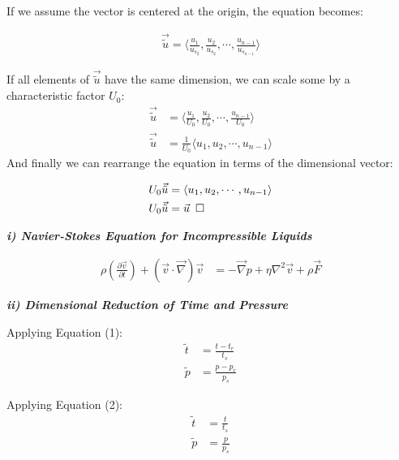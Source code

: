 \documentclass[titlepage]{article}
\begin{document}
\noindent If we assume the vector is centered at the origin, the equation becomes: 

\begin{align}
    \vec{\tilde{u}}=\langle{\displaystyle\frac{u_{1}}{u_{s_{2}}}, \displaystyle\frac{u_{2}}{u_{s_{2}}}, \cdots, \displaystyle\frac{u_{n-1}}{u_{s_{n-1}}}}\rangle
\end{align}

\noindent If all  elements of $\vec{\tilde{u}}$ have the same dimension, we can scale some by a characteristic factor $U_{0}$:
\begin{align}
    \vec{\tilde{u}} &= \langle{\displaystyle\frac{u_{1}}{U_{0}}, \displaystyle\frac{u_{2}}{U_{0}}, \cdots, \displaystyle\frac{u_{n-1}}{U_{0}}}\rangle \\
    \vec{\tilde{u}} &= \displaystyle\frac{1}{U_{0}}\langle{u_{1}, u_{2}, \cdots, u_{n-1}}\rangle
\end{align}
\noindent And finally we can rearrange the equation in terms of the dimensional vector: 

\begin{align}
    U_{0}\vec{\tilde{u}} &= \langle{u_{1}, u_{2}, \cdots, u_{n-1}}\rangle \\
    U_{0}\vec{\tilde{u}} &= \vec{u}\hspace*{5pt}\square
\end{align}

\newpage

\begin{center}
    \textbf{\emph{i) Navier-Stokes Equation for Incompressible Liquids}}
\end{center}
\begin{align}
    \rho\left(\displaystyle\frac{\partial\vec{v}}{\partial{t}}\right)+\left(\vec{v}\cdot\vec{\nabla}\right)\vec{v} &= -\vec{\nabla}p+\eta\nabla^2\vec{v}+\rho\vec{F}
\end{align}

\begin{center}
    \textbf{\emph{ii) Dimensional Reduction of Time and Pressure}}
\end{center}

Applying Equation (1):
\begin{align}
    \tilde{t}  &=  \displaystyle\frac{t-t_{r}}{t_{s}} \\
    \tilde{p}  &=  \displaystyle\frac{p-p_{r}}{p_{s}}
\end{align}

Applying Equation (2):
\begin{align}
    \tilde{t}  &=  \displaystyle\frac{t}{t_{s}} \\
    \tilde{p}  &=  \displaystyle\frac{p}{p_{s}}
\end{align}
\end{document}
